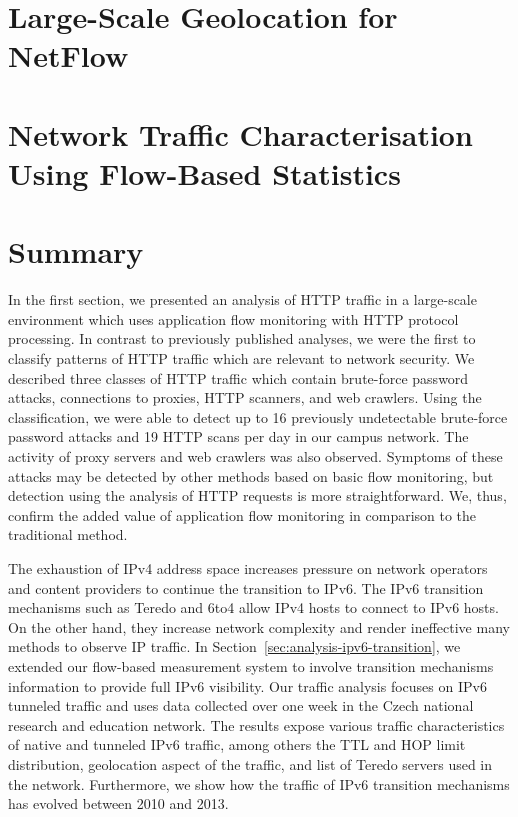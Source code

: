 \section{Large-Scale Geolocation for NetFlow}\label{sec:analysis-geolocation}

\section{Network Traffic Characterisation Using Flow-Based Statistics}\label{sec:analysis-characterisation}


\section{Summary}\label{sec:use-cases-summary}

In the first section, we presented an analysis of HTTP traffic in a large-scale environment which uses application flow monitoring with HTTP protocol processing. In contrast to previously published analyses, we were the first to classify patterns of HTTP traffic which are relevant to network security. We described three classes of HTTP traffic which contain brute-force password attacks, connections to proxies, HTTP scanners, and web crawlers. Using the classification, we were able to detect up to 16 previously undetectable brute-force password attacks and 19 HTTP scans per day in our campus network. The activity of proxy servers and web crawlers was also observed. Symptoms of these attacks may be detected by other methods based on basic flow monitoring, but detection using the analysis of HTTP requests is more straightforward. We, thus, confirm the added value of application flow monitoring in comparison to the traditional method.

The exhaustion of IPv4 address space increases pressure on network operators and content providers to continue the transition to IPv6. The IPv6 transition mechanisms such as Teredo and 6to4 allow IPv4 hosts to connect to IPv6 hosts. On the other hand, they increase network complexity and render ineffective many methods to observe IP traffic. In Section~\ref{sec:analysis-ipv6-transition}, we extended our flow-based measurement system to involve transition mechanisms information to provide full IPv6 visibility. Our traffic analysis focuses on IPv6 tunneled traffic and uses data collected over one week in the Czech national research and education network. The results expose various traffic characteristics of native and tunneled IPv6 traffic, among others the TTL and HOP limit distribution, geolocation aspect of the traffic, and list of Teredo servers used in the network. Furthermore, we show how the traffic of IPv6 transition mechanisms has evolved between 2010 and 2013.